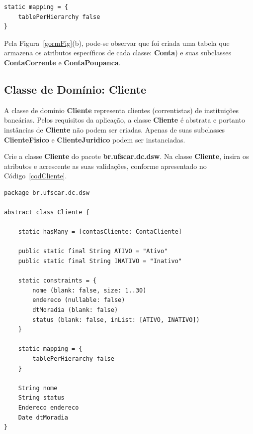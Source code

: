 \begin{cBox}
\begin{verbatim}
static mapping = {
    tablePerHierarchy false
}
\end{verbatim}
\end{cBox}

Pela  Figura~\ref{gormFig}(b), pode-se observar  que foi  criada uma  tabela que
armazena os atributos específicos de cada classe: {\bf Conta}) e suas subclasses
{\bf ContaCorrente} e {\bf ContaPoupanca}.

\newpage

\subsection{Classe de Domínio: Cliente}\label{secCliente}

\vspace{0.5cm}

A  classe  de  domínio  {\bf  Cliente}  representa  clientes  (correntistas)  de
instituições bancárias. Pelos requisitos da  aplicação, a classe {\bf Cliente} é
abstrata e portanto instâncias de {\bf Cliente} não podem ser criadas. Apenas de
suas  subclasses   {\bf  ClienteFisico}   e  {\bf  ClienteJuridico}   podem  ser
instanciadas.

\vspace{0.2cm}

Crie a  classe {\bf Cliente} do  pacote {\bf br.ufscar.dc.dsw}.   Na classe {\bf
  Cliente},  insira  os atributos  e  acrescente  as  suas validações,  conforme
apresentado no Código~\ref{codCliente}. 

\begin{lstlisting}[caption=Classe  de  domínio  {\bf  Cliente},  frame  =  trBL,
    float=htbp, label=codCliente] 
package br.ufscar.dc.dsw

abstract class Cliente {

    static hasMany = [contasCliente: ContaCliente]
    
    public static final String ATIVO = "Ativo"
    public static final String INATIVO = "Inativo"
    
    static constraints = {
        nome (blank: false, size: 1..30)
        endereco (nullable: false)
        dtMoradia (blank: false)
        status (blank: false, inList: [ATIVO, INATIVO])
    }
    
    static mapping = { 
        tablePerHierarchy false
    }
    
    String nome
    String status
    Endereco endereco
    Date dtMoradia
}
\end{lstlisting}

